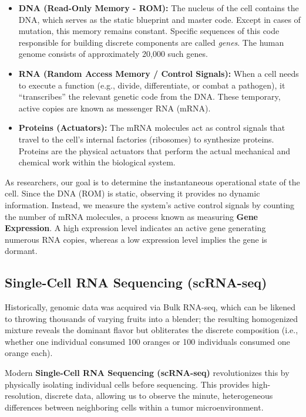 \documentclass[12pt, a4paper]{article}
\begin{document}
	\begin{itemize}
		\item \textbf{DNA (Read-Only Memory - ROM):} The nucleus of the cell contains the DNA, which serves as the static blueprint and master code. Except in cases of mutation, this memory remains constant. Specific sequences of this code responsible for building discrete components are called \textit{genes}. The human genome consists of approximately 20,000 such genes.
		\item \textbf{RNA (Random Access Memory / Control Signals):} When a cell needs to execute a function (e.g., divide, differentiate, or combat a pathogen), it ``transcribes'' the relevant genetic code from the DNA. These temporary, active copies are known as messenger RNA (mRNA).
		\item \textbf{Proteins (Actuators):} The mRNA molecules act as control signals that travel to the cell's internal factories (ribosomes) to synthesize proteins. Proteins are the physical actuators that perform the actual mechanical and chemical work within the biological system.
	\end{itemize}
	
	As researchers, our goal is to determine the instantaneous operational state of the cell. Since the DNA (ROM) is static, observing it provides no dynamic information. Instead, we measure the system's active control signals by counting the number of mRNA molecules, a process known as measuring \textbf{Gene Expression}. A high expression level indicates an active gene generating numerous RNA copies, whereas a low expression level implies the gene is dormant.
	
	\subsection{Single-Cell RNA Sequencing (scRNA-seq)}
	Historically, genomic data was acquired via Bulk RNA-seq, which can be likened to throwing thousands of varying fruits into a blender; the resulting homogenized mixture reveals the dominant flavor but obliterates the discrete composition (i.e., whether one individual consumed 100 oranges or 100 individuals consumed one orange each). 
	
	Modern \textbf{Single-Cell RNA Sequencing (scRNA-seq)} revolutionizes this by physically isolating individual cells before sequencing. This provides high-resolution, discrete data, allowing us to observe the minute, heterogeneous differences between neighboring cells within a tumor microenvironment. 
	
\end{document}
